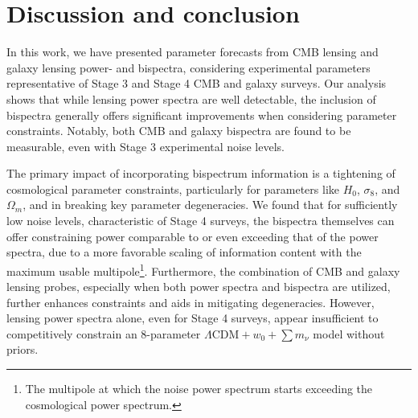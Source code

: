 \documentclass[11pt]{article} %
\begin{document}
\pagebreak



\section{Discussion and conclusion}\label{sec:discussion}
In this work, we have presented parameter forecasts from CMB lensing and galaxy lensing power- and bispectra, considering experimental parameters representative of Stage 3 and Stage 4 CMB and galaxy surveys. Our analysis shows that while lensing power spectra are well detectable, the inclusion of bispectra generally offers significant improvements when considering parameter constraints. Notably, both CMB and galaxy bispectra are found to be measurable, even with Stage 3 experimental noise levels.

The primary impact of incorporating bispectrum information is a tightening of cosmological parameter constraints, particularly for parameters like $H_0$, $\sigma_8$, and $\Omega_m$, and in breaking key parameter degeneracies. We found that for sufficiently low noise levels, characteristic of Stage 4 surveys, the bispectra themselves can offer constraining power comparable to or even exceeding that of the power spectra, due to a more favorable scaling of information content with the maximum usable multipole\footnote{The multipole at which the noise power spectrum starts exceeding the cosmological power spectrum.}. Furthermore, the combination of CMB and galaxy lensing probes, especially when both power spectra and bispectra are utilized, further enhances constraints and aids in mitigating degeneracies. However, lensing power spectra alone, even for Stage 4 surveys, appear insufficient to competitively constrain an 8-parameter $\Lambda\text{CDM} + w_0 + \sum m_\nu$ model without priors.
\end{document}
